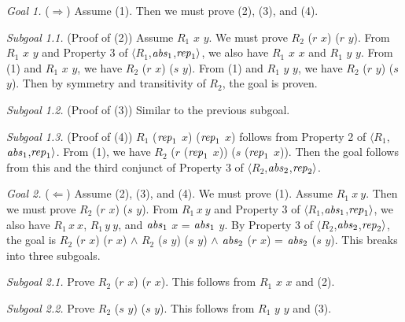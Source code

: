 \documentclass[envcountsame,runningheads]{llncs}
\begin{document}
{\it Goal 1.}
($\Rightarrow$)
Assume (1).  Then we must prove (2), (3), and (4).

{\it Subgoal 1.1.} (Proof of (2))
Assume $R_1$ $x$ $y$.  We must prove $R_2$ ($r$ $x$) ($r$ $y$).
From $R_1$ $x$ $y$ and Property 3 of
$\langle R_1$,${\it abs}_1$,${\it rep}_1 \rangle$,
we also have
$R_1$ $x$ $x$ and
$R_1$ $y$ $y$.
From (1) and $R_1$ $x$ $y$, we have $R_2$ ($r$ $x$) ($s$ $y$).
From (1) and $R_1$ $y$ $y$, we have $R_2$ ($r$ $y$) ($s$ $y$).
Then by symmetry and transitivity of $R_2$, the goal is proven.

{\it Subgoal 1.2.} (Proof of (3)) Similar to the previous subgoal.

{\it Subgoal 1.3.} (Proof of (4))
$R_1$ (${\it rep}_1$ $x$) (${\it rep}_1$ $x$) follows from
Property 2 of
$\langle R_1$,${\it abs}_1$,${\it rep}_1 \rangle$.
From (1),
we have
$R_2$ ($r$ (${\it rep}_1$ $x$)) ($s$ (${\it rep}_1$ $x$)).
Then the goal follows from this and the third conjunct of Property 3 of
$\langle R_2$,${\it abs}_2$,${\it rep}_2 \rangle$.

{\it Goal 2.} ($\Leftarrow$)
Assume (2), (3), and (4).  We must prove (1).
Assume $R_1\ x\ y$.  Then we must prove $R_2$ ($r$ $x$) ($s$ $y$).
From $R_1\,x\ y$ and Property 3 of
$\langle R_1$,${\it abs}_1$,${\it rep}_1 \rangle$,
we also have
$R_1\,x\ x$,
$R_1\,y\ y$, and
${\it abs}_1$ $x$ = ${\it abs}_1$ $y$.
By Property 3 of
$\langle R_2$,${\it abs}_2$,${\it rep}_2 \rangle$,
the goal is
$R_2$ ($r$ $x$) ($r$ $x$) $\wedge$
$R_2$ ($s$ $y$) ($s$ $y$) $\wedge$
${\it abs}_2$ ($r$ $x$) = ${\it abs}_2$ ($s$ $y$).
This breaks into three subgoals.

{\it Subgoal 2.1.} Prove $R_2$ ($r$ $x$) ($r$ $x$).
This follows from
$R_1$ $x$ $x$ and (2).

{\it Subgoal 2.2.} Prove $R_2$ ($s$ $y$) ($s$ $y$).
This follows from
$R_1$ $y$ $y$ and (3).
\end{document}
